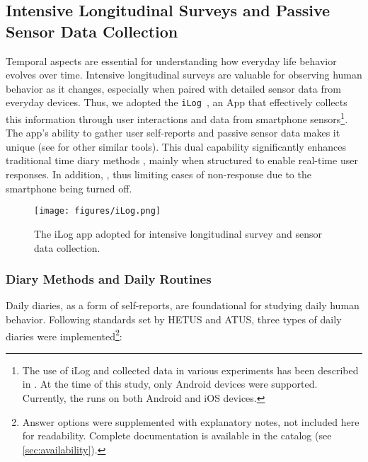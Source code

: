 \subsection{Intensive Longitudinal Surveys and Passive Sensor Data Collection} \label{subsec:ils}

Temporal aspects are essential for understanding how everyday life behavior evolves over time. Intensive longitudinal surveys are valuable for observing human behavior as it changes, especially when paired with detailed sensor data from everyday devices. Thus, we adopted the \texttt{iLog}~\cite{2014-PERCOM}, an App that effectively collects this information through user interactions and data from smartphone sensors\footnote{The use of iLog and collected data in various experiments has been described in \cite{2020-zeni1,2017-SOCINFO,KD-2017-PERCOM,2017-ICSC,2018-PERCOM2}. At the time of this study, only Android devices were supported. Currently, the  runs on both Android and iOS devices.}. 
 The app’s ability to gather user self-reports and passive sensor data makes it unique (see \cite{runyan2013smartphone,wang2014studentlife,kreuter2020collecting} for other similar tools). This dual capability significantly enhances traditional time diary methods \cite{2018-PERCOM1,sorokin1939time}, mainly when structured \cite{hellgren2014extracting} to enable real-time user responses. In addition, , thus limiting cases of non-response due to the smartphone being turned off.

\begin{figure}[t]
    \texttt{[image: figures/iLog.png]}
    \caption{The iLog app adopted for intensive longitudinal survey and sensor data collection.}
    \label{fig:ilogapp}
\end{figure}


\subsubsection{Diary Methods and Daily Routines}\label{sec:td}
Daily diaries, as a form of self-reports, are foundational for studying daily human behavior. Following standards set by HETUS and ATUS, three types of daily diaries were implemented\footnote{Answer options were supplemented with explanatory notes, not included here for readability. Complete documentation is available in the catalog (see \cref{sec:availability}).}:

